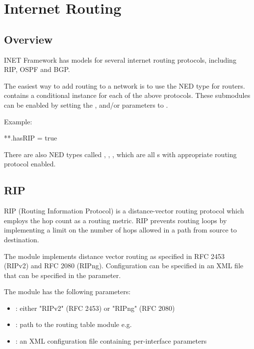 \chapter{Internet Routing}
\label{cha:routing}

\section{Overview}
\label{sec:routing:overview}

INET Framework has models for several internet routing protocols, including
RIP, OSPF and BGP.

The easiest way to add routing to a network is to use the 
NED type for routers.  contains a conditional instance
for each of the above protocols. These submodules can be enabled by
setting the ,  and/or  parameters to
.

Example:

\begin{inifile}
**.hasRIP = true
\end{inifile}

There are also NED types called , ,
, which are all s with appropriate
routing protocol enabled.

\section{RIP}
\label{sec:routing:rip}

RIP (Routing Information Protocol) is a distance-vector routing protocol
which employs the hop count as a routing metric. RIP prevents routing loops
by implementing a limit on the number of hops allowed in a path from source
to destination.

The  module implements distance vector routing as
specified in RFC 2453 (RIPv2) and RFC 2080 (RIPng). Configuration
can be specified in an XML file that can be specified in the
 parameter.

The  module has the following parameters:

\begin{itemize}
  \item {}: either "RIPv2" (RFC 2453) or "RIPng" (RFC 2080)
  \item {}: path to the routing table module
        e.g. 
  \item {}: an XML configuration file containing per-interface parameters
\end{itemize}

